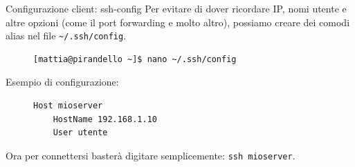 \begin{frame}[fragile]{Configurazione client: ssh-config}
  Per evitare di dover ricordare IP, nomi utente e altre opzioni (come il port forwarding e molto altro), possiamo creare dei comodi alias nel file \texttt{\textasciitilde/.ssh/config}.
  \begin{figure}
    \begin{lstlisting}
[mattia@pirandello ~]$ nano ~/.ssh/config
\end{lstlisting}
  \end{figure}

  Esempio di configurazione:
  \begin{figure}
    \begin{lstlisting}[backgroundcolor=\color{expowhite!50!white}]
Host mioserver
    HostName 192.168.1.10
    User utente
\end{lstlisting}
  \end{figure}\medskip

  Ora per connettersi basterà digitare semplicemente: \texttt{ssh mioserver}.
\end{frame}